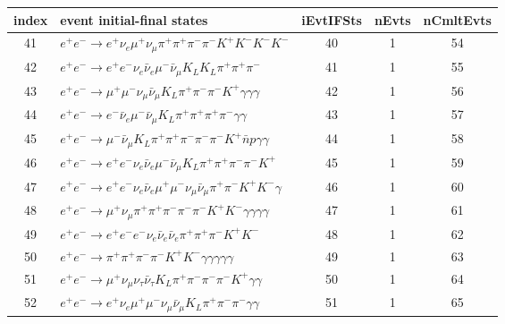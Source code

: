 \documentclass[landscape]{article}
\begin{document}
\clearpage

\begin{table}[htbp!]
\small
\centering
\begin{tabular}{|c|>{\centering}p{18cm}|c|c|c|}
\hline
index & event initial-final states & iEvtIFSts & nEvts & nCmltEvts \\
\hline
41 & $ e^{+} e^{-} \rightarrow e^{+} \nu_{e} \mu^{+} \nu_{\mu} \pi^{+} \pi^{+} \pi^{-} \pi^{-} K^{+} K^{-} K^{-} K^{-} $ & 40 & 1 & 54 \\
\hline
42 & $ e^{+} e^{-} \rightarrow e^{+} e^{-} \nu_{e} \bar{\nu}_{e} \mu^{-} \bar{\nu}_{\mu} K_{L} K_{L} \pi^{+} \pi^{+} \pi^{-} $ & 41 & 1 & 55 \\
\hline
43 & $ e^{+} e^{-} \rightarrow \mu^{+} \mu^{-} \nu_{\mu} \bar{\nu}_{\mu} K_{L} \pi^{+} \pi^{-} \pi^{-} K^{+} \gamma \gamma \gamma $ & 42 & 1 & 56 \\
\hline
44 & $ e^{+} e^{-} \rightarrow e^{-} \bar{\nu}_{e} \mu^{-} \bar{\nu}_{\mu} K_{L} \pi^{+} \pi^{+} \pi^{+} \pi^{-} \gamma \gamma $ & 43 & 1 & 57 \\
\hline
45 & $ e^{+} e^{-} \rightarrow \mu^{-} \bar{\nu}_{\mu} K_{L} \pi^{+} \pi^{+} \pi^{-} \pi^{-} \pi^{-} K^{+} \bar{n} p \gamma \gamma $ & 44 & 1 & 58 \\
\hline
46 & $ e^{+} e^{-} \rightarrow e^{+} e^{-} \nu_{e} \bar{\nu}_{e} \mu^{-} \bar{\nu}_{\mu} K_{L} \pi^{+} \pi^{+} \pi^{-} \pi^{-} K^{+} $ & 45 & 1 & 59 \\
\hline
47 & $ e^{+} e^{-} \rightarrow e^{+} e^{-} \nu_{e} \bar{\nu}_{e} \mu^{+} \mu^{-} \nu_{\mu} \bar{\nu}_{\mu} \pi^{+} \pi^{-} K^{+} K^{-} \gamma $ & 46 & 1 & 60 \\
\hline
48 & $ e^{+} e^{-} \rightarrow \mu^{+} \nu_{\mu} \pi^{+} \pi^{+} \pi^{-} \pi^{-} \pi^{-} K^{+} K^{-} \gamma \gamma \gamma \gamma $ & 47 & 1 & 61 \\
\hline
49 & $ e^{+} e^{-} \rightarrow e^{+} e^{-} e^{-} \nu_{e} \bar{\nu}_{e} \bar{\nu}_{e} \pi^{+} \pi^{+} \pi^{-} K^{+} K^{-} $ & 48 & 1 & 62 \\
\hline
50 & $ e^{+} e^{-} \rightarrow \pi^{+} \pi^{+} \pi^{-} \pi^{-} K^{+} K^{-} \gamma \gamma \gamma \gamma \gamma $ & 49 & 1 & 63 \\
\hline
51 & $ e^{+} e^{-} \rightarrow \mu^{+} \nu_{\mu} \nu_{\tau} \bar{\nu}_{\tau} K_{L} \pi^{+} \pi^{-} \pi^{-} \pi^{-} K^{+} \gamma \gamma $ & 50 & 1 & 64 \\
\hline
52 & $ e^{+} e^{-} \rightarrow e^{+} \nu_{e} \mu^{+} \mu^{-} \nu_{\mu} \bar{\nu}_{\mu} K_{L} \pi^{+} \pi^{-} \pi^{-} \gamma \gamma $ & 51 & 1 & 65 \\

\end{tabular}
\end{table}
\end{document}
